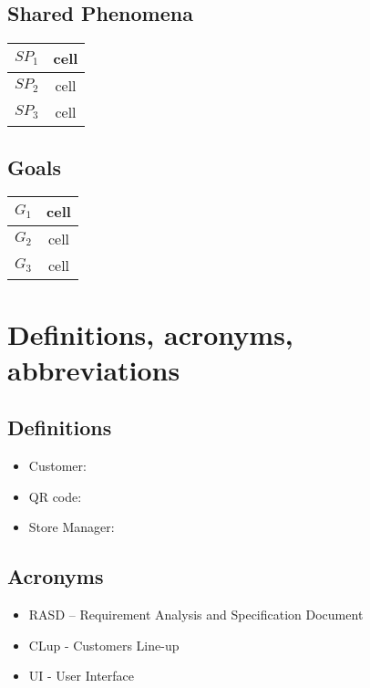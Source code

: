 \documentclass[a4paper,12pt]{book}
\begin{document}
\subsection{Shared Phenomena}
\begin{center}
	\begin{tabular}{ c|c } 
		\hline
		$SP_1$ & cell \\ 
		\hline
		$SP_2$ & cell \\ 
		\hline
		$SP_3$ & cell \\ 
		\hline
	\end{tabular}
\end{center}

\subsection{Goals}
\begin{center}
	\begin{tabular}{ c|c } 
		\hline
		$G_1$ & cell \\ 
		\hline
		$G_2$ & cell \\ 
		\hline
		$G_3$ & cell \\ 
		\hline
	\end{tabular}
\end{center}


\section{Definitions, acronyms, abbreviations}

\subsection{Definitions}
\begin{itemize}
	\item Customer:
	\item QR code:
	\item Store Manager:
\end{itemize}


\subsection{Acronyms}

\begin{itemize}
	\item RASD – Requirement Analysis and Specification Document
	\item CLup - Customers Line-up
	\item UI - User Interface
\end{itemize}
\end{document}
